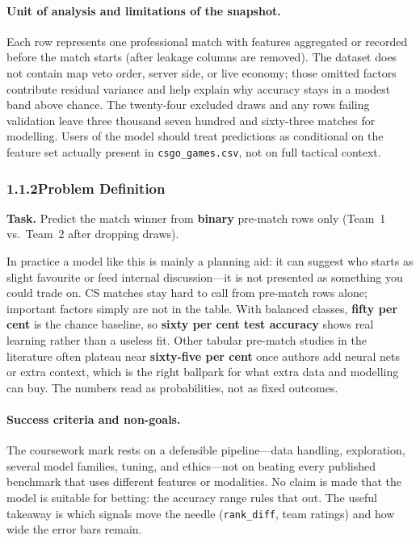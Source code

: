 \documentclass[12pt,a4paper]{article}
\begin{document}
\paragraph{Unit of analysis and limitations of the snapshot.}
Each row represents one professional match with features aggregated or recorded before the match starts (after leakage columns are removed). The dataset does not contain map veto order, server side, or live economy; those omitted factors contribute residual variance and help explain why accuracy stays in a modest band above chance. The twenty-four excluded draws and any rows failing validation leave three thousand seven hundred and sixty-three matches for modelling. Users of the model should treat predictions as conditional on the feature set actually present in \texttt{csgo\_games.csv}, not on full tactical context.

\subsubsection{1.1.2\quad Problem Definition}

\textbf{Task.} Predict the match winner from \textbf{binary} pre-match rows only (Team~1 vs.\ Team~2 after dropping draws).

In practice a model like this is mainly a planning aid: it can suggest who starts as slight favourite or feed internal discussion---it is not presented as something you could trade on. CS matches stay hard to call from pre-match rows alone; important factors simply are not in the table. With balanced classes, \textbf{fifty per cent} is the chance baseline, so \textbf{sixty per cent test accuracy} shows real learning rather than a useless fit. Other tabular pre-match studies in the literature often plateau near \textbf{sixty-five per cent} once authors add neural nets or extra context, which is the right ballpark for what extra data and modelling can buy. The numbers read as probabilities, not as fixed outcomes.

\paragraph{Success criteria and non-goals.}
The coursework mark rests on a defensible pipeline---data handling, exploration, several model families, tuning, and ethics---not on beating every published benchmark that uses different features or modalities. No claim is made that the model is suitable for betting: the accuracy range rules that out. The useful takeaway is which signals move the needle (\texttt{rank\_diff}, team ratings) and how wide the error bars remain.
\end{document}
